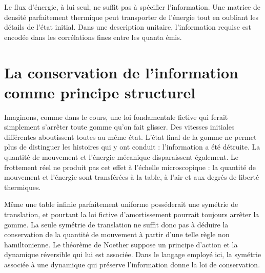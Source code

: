 Le flux d’énergie, à lui seul, ne suffit pas à spécifier l’information. Une matrice de densité parfaitement thermique peut transporter de l’énergie tout en oubliant les détails de l’état initial. Dans une description unitaire, l’information requise est encodée dans les corrélations fines entre les quanta émis.

\section{La conservation de l’information comme principe structurel}

\begin{classroomqa}
\end{classroomqa}

Imaginons, comme dans le cours, une loi fondamentale fictive qui ferait simplement s’arrêter toute gomme qu’on fait glisser. Des vitesses initiales différentes aboutissent toutes au même état. L’état final de la gomme ne permet plus de distinguer les histoires qui y ont conduit : l’information a été détruite. La quantité de mouvement et l’énergie mécanique disparaissent également. Le frottement réel ne produit pas cet effet à l’échelle microscopique : la quantité de mouvement et l’énergie sont transférées à la table, à l’air et aux degrés de liberté thermiques.

Même une table infinie parfaitement uniforme posséderait une symétrie de translation, et pourtant la loi fictive d’amortissement pourrait toujours arrêter la gomme. La seule symétrie de translation ne suffit donc pas à déduire la conservation de la quantité de mouvement à partir d’une telle règle non hamiltonienne. Le théorème de Noether suppose un principe d’action et la dynamique réversible qui lui est associée. Dans le langage employé ici, la symétrie associée à une dynamique qui préserve l’information donne la loi de conservation.

